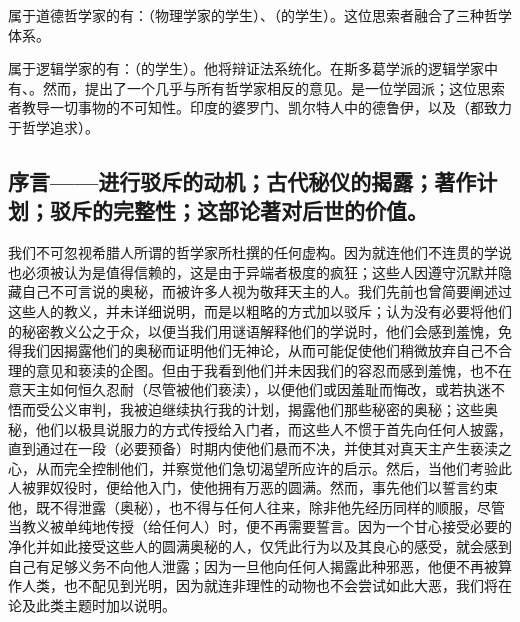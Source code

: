 属于道德哲学家的有：（物理学家的学生）、（的学生）。这位思索者融合了三种哲学体系。\par

属于逻辑学家的有：（的学生）。他将辩证法系统化。在斯多葛学派的逻辑学家中有、。然而，提出了一个几乎与所有哲学家相反的意见。是一位学园派；这位思索者教导一切事物的不可知性。印度的婆罗门、凯尔特人中的德鲁伊，以及（都致力于哲学追求）。\par


\subsection{序言——进行驳斥的动机；古代秘仪的揭露；著作计划；驳斥的完整性；这部论著对后世的价值。}

我们不可忽视希腊人所谓的哲学家所杜撰的任何虚构。因为就连他们不连贯的学说也必须被认为是值得信赖的，这是由于异端者极度的疯狂；这些人因遵守沉默并隐藏自己不可言说的奥秘，而被许多人视为敬拜天主的人。我们先前也曾简要阐述过这些人的教义，并未详细说明，而是以粗略的方式加以驳斥；认为没有必要将他们的秘密教义公之于众，以便当我们用谜语解释他们的学说时，他们会感到羞愧，免得我们因揭露他们的奥秘而证明他们无神论，从而可能促使他们稍微放弃自己不合理的意见和亵渎的企图。但由于我看到他们并未因我们的容忍而感到羞愧，也不在意天主如何恒久忍耐（尽管被他们亵渎），以便他们或因羞耻而悔改，或若执迷不悟而受公义审判，我被迫继续执行我的计划，揭露他们那些秘密的奥秘；这些奥秘，他们以极具说服力的方式传授给入门者，而这些人不惯于首先向任何人披露，直到通过在一段（必要预备）时期内使他们悬而不决，并使其对真天主产生亵渎之心，从而完全控制他们，并察觉他们急切渴望所应许的启示。然后，当他们考验此人被罪奴役时，便给他入门，使他拥有万恶的圆满。然而，事先他们以誓言约束他，既不得泄露（奥秘），也不得与任何人往来，除非他先经历同样的顺服，尽管当教义被单纯地传授（给任何人）时，便不再需要誓言。因为一个甘心接受必要的净化并如此接受这些人的圆满奥秘的人，仅凭此行为以及其良心的感受，就会感到自己有足够义务不向他人泄露；因为一旦他向任何人揭露此种邪恶，他便不再被算作人类，也不配见到光明，因为就连非理性的动物也不会尝试如此大恶，我们将在论及此类主题时加以说明。\par

